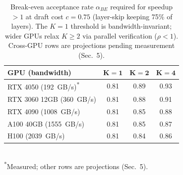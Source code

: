 \begin{table}[t]
\centering
\footnotesize
\caption{Break-even acceptance rate $\alpha_{BE}$ required for speedup $>1$ at draft cost $c{=}0.75$ (layer-skip keeping 75\% of layers). The $K{=}1$ threshold is bandwidth-invariant; wider GPUs relax $K{\ge}2$ via parallel verification ($\rho<1$). Cross-GPU rows are projections pending measurement (Sec.~5).}
\label{tab:breakeven}
\begin{tabular}{lccc}
\toprule
\textbf{GPU (bandwidth)} & $\mathbf{K{=}1}$ & $\mathbf{K{=}2}$ & $\mathbf{K{=}4}$ \\
\midrule
RTX 4050 (192~GB/s)\textsuperscript{*} & 0.81 & 0.89 & 0.93 \\
RTX 3060 12GB (360~GB/s) & 0.81 & 0.88 & 0.91 \\
RTX 4090 (1008~GB/s) & 0.81 & 0.85 & 0.88 \\
A100 40GB (1555~GB/s) & 0.81 & 0.85 & 0.87 \\
H100 (2039~GB/s) & 0.81 & 0.84 & 0.86 \\
\bottomrule
\end{tabular}
\\[-2pt]
{\scriptsize \textsuperscript{*}Measured; other rows are projections (Sec.~5).}
\end{table}
